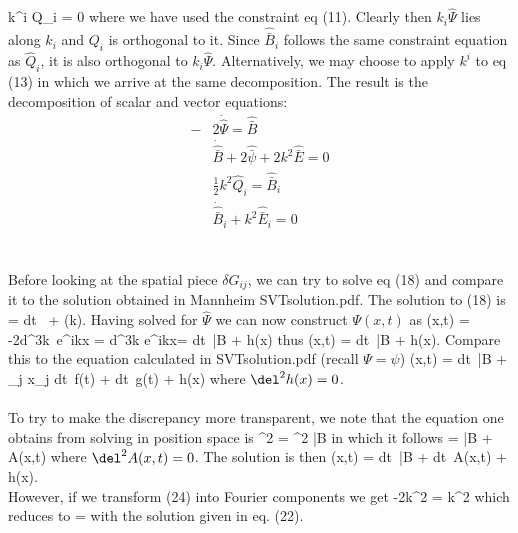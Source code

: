 \documentclass[10pt,letterpaper]{article}
\begin{document}
\be
	k^i \hat \Psi \hat Q_i = 0
\ee
where we have used the constraint eq (11). Clearly then $k_i\hat \Psi$ lies along $k_i$ and $Q_i$ is orthogonal to it. Since $\hat{\bar B}_i$ follows the same constraint equation as $\hat Q_i$, it is also orthogonal to $k_i\hat\Psi$. Alternatively, we may choose to apply $k^i$ to eq (13) in which we arrive at the same decomposition. The result is the decomposition of scalar and vector equations:
\begin{align}
-&2\dot{\hat\Psi} = \hat{\bar B}\\
&\dot{\hat{\bar B}} + 2\hat{\bar \psi} + 2k^2 \hat{\bar E} = 0\\
&\frac12 k^2 \hat{Q}_i = \hat{\bar B}_i\\
&\dot{\hat{\bar B}}_i + k^2\hat{\bar E}_i = 0
\end{align}
\\ \\
Before looking at the spatial piece $\delta G_{ij}$, we can try to solve eq (18) and compare it to the solution obtained in Mannheim SVTsolution.pdf. The solution to (18) is
\hat\Psi = \int dt\  + (k).
\ee
Having solved for $\hat \Psi$ we can now construct $\Psi(x,t)$ as
\Psi(x,t) = -2\int d^3k\ e^{ikx}\hat\Psi
 = \int d^3k e^{ikx}= \int dt\ \bar B + h(x)
\ee
thus
\Psi(x,t) =  \int dt\ \bar B + h(x).
\ee
Compare this to the equation calculated in SVTsolution.pdf (recall $\Psi = \psi$)
\psi(x,t) = \int dt\ \bar B + \alpha_j x_j \int dt\ f(t) + \int dt\ g(t) + h(x)
\ee
where $\del^2 h(x) = 0$. 
\\ \\
To try to make the discrepancy more transparent, we note that the equation one obtains from solving in position space is
\del^2 \dot \psi = \del^2 \bar B
\ee
in which it follows
\dot \psi = \bar B + A(x,t)
\ee
where $\del^2 A(x,t) = 0$. The solution is then
\psi(x,t) = \int dt\ \bar B + \int dt\  A(x,t) + h(x).
\ee
\\ 
However, if we transform (24) into Fourier components we get
\be
	-2k^2 \hat \Psi = k^2 
\ee
which reduces to
\hat \Psi = 
\ee
with the solution given in eq. (22).
\\
\\
\end{document}
